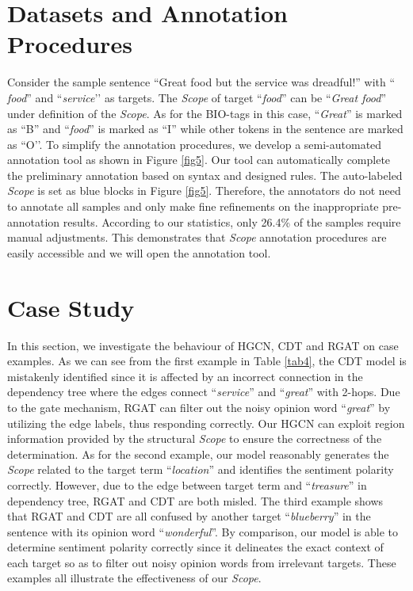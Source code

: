 \documentclass{article}
\begin{document}



\appendix

\section{Datasets and Annotation Procedures}\label{app1}

Consider the sample sentence ``Great food but the service was dreadful!'' with `` \emph{food}'' and ``\emph{service}’’ as targets. The \emph{Scope} of target ``\emph{food}'' can be ``\emph{Great food}'' under definition of the \emph{Scope}. As for the BIO-tags in this case, ``\emph{Great}'' is marked as ``B'' and ``\emph{food}'' is marked as ``I'' while other tokens in the sentence are marked as ``O’’. To simplify the annotation procedures, we develop a semi-automated annotation tool as shown in Figure \ref{fig5}. Our tool can automatically complete the preliminary annotation based on syntax and designed rules. The auto-labeled \emph{Scope} is set as blue blocks in Figure \ref{fig5}. Therefore, the annotators do not need to annotate all samples and only make fine refinements on the inappropriate pre-annotation results. According to our statistics, only 26.4\% of the samples require manual adjustments. This demonstrates that \emph{Scope} annotation procedures are easily accessible and we will open the annotation tool.

\section{Case Study}\label{app2}

In this section, we investigate the behaviour of HGCN, CDT and RGAT on case examples. As we can see from the first example in Table \ref{tab4}, the CDT model is mistakenly identified since it is affected by an incorrect connection in the dependency tree where the edges connect ``\emph{service}'' and ``\emph{great}'' with 2-hops. Due to the gate mechanism, RGAT can filter out the noisy opinion word ``\emph{great}'' by utilizing the edge labels, thus responding correctly. Our HGCN can exploit region information provided by the structural \emph{Scope} to ensure the correctness of the determination. As for the second example, our model reasonably generates the \emph{Scope} related to the target term ``\emph{location}'' and identifies the sentiment polarity correctly. However, due to the edge between target term and ``\emph{treasure}'' in dependency tree, RGAT and CDT are both misled. The third example shows that RGAT and CDT are all confused by another target ``\emph{blueberry}'' in the sentence with its opinion word ``\emph{wonderful}''. By comparison, our model is able to determine sentiment polarity correctly since it delineates the exact context of each target so as to filter out noisy opinion words from irrelevant targets. These examples all illustrate the effectiveness of our \emph{Scope}.
\end{document}
